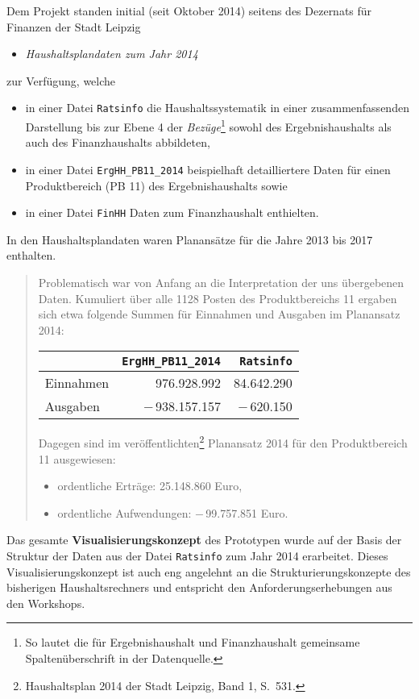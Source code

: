 \documentclass[a4paper,11pt,twoside]{article}
\begin{document}
Dem Projekt standen initial (seit Oktober 2014) seitens des Dezernats für
Finanzen der Stadt Leipzig
\begin{itemize}
\item[(1)] \emph{Haushaltsplandaten zum Jahr 2014}
\end{itemize}
zur Verfügung, welche 
\begin{itemize}\itemsep0pt
\item in einer Datei \texttt{Ratsinfo} die Haushaltssystematik in einer
  zusammenfassenden Darstellung bis zur Ebene 4 der \emph{Bezüge}\footnote{So
    lautet die für Ergebnishaushalt und Finanzhaushalt gemeinsame
    Spaltenüberschrift in der Datenquelle.}  sowohl des Ergebnishaushalts als
  auch des Finanzhaushalts abbildeten, 
\item in einer Datei \texttt{ErgHH\_PB11\_2014} beispielhaft detailliertere
  Daten für einen Produktbereich (PB 11) des Ergebnishaushalts sowie 
\item in einer Datei \texttt{FinHH} Daten zum Finanzhaushalt enthielten. 
\end{itemize}
\pagebreak[3]
In den Haushaltsplandaten waren Planansätze für die Jahre 2013 bis 2017
enthalten.
\begin{quote}
  Problematisch war von Anfang an die Interpretation der uns übergebenen Daten.
  Kumuliert über alle 1128 Posten des Produktbereichs 11 ergaben sich etwa
  folgende Summen für Einnahmen und Ausgaben im Planansatz 2014:
  \begin{center}
    \begin{tabular}{l|r|r}
      & \texttt{ErgHH\_PB11\_2014}& \texttt{Ratsinfo}\\\hline
      Einnahmen & 976.928.992 & 84.642.290 \\
      Ausgaben & $-$\,938.157.157 & $-$\,620.150
    \end{tabular}
  \end{center}
  Dagegen sind im veröffentlichten\footnote{Haushaltsplan 2014 der Stadt
    Leipzig, Band 1, S.~531.} Planansatz 2014 für den Produktbereich 11
  ausgewiesen:
  \begin{itemize}
  \item ordentliche Erträge: 25.148.860 Euro,
  \item ordentliche Aufwendungen: $-$\,99.757.851 Euro.
  \end{itemize}
\end{quote}
Das gesamte \textbf{Visualisierungskonzept} des Prototypen wurde auf der Basis
der Struktur der Daten aus der Datei \texttt{Ratsinfo} zum Jahr 2014
erarbeitet.  Dieses Visualisierungskonzept ist auch eng angelehnt an die
Strukturierungskonzepte des bisherigen Haushaltsrechners und entspricht den
Anforderungserhebungen aus den Workshops.
\end{document}
